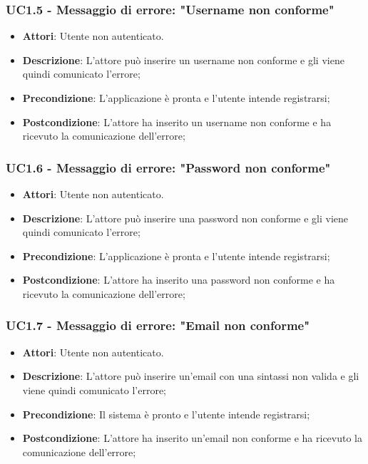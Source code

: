 \subsubsection{UC1.5 - Messaggio di errore: "Username non conforme"} 
\label{sssec:UC1.5} 
\begin{itemize} 
\item \textbf{Attori}: Utente non autenticato.
\item \textbf{Descrizione}: L'attore può inserire un username non conforme e gli viene quindi comunicato l'errore;
\item \textbf{Precondizione}: L'applicazione è pronta e l'utente intende registrarsi;
\item \textbf{Postcondizione}: L'attore ha inserito un username non conforme e ha ricevuto la comunicazione dell'errore;
\end{itemize} 
\subsubsection{UC1.6 - Messaggio di errore: "Password non conforme"} 
\label{sssec:UC1.6} 
\begin{itemize} 
\item \textbf{Attori}: Utente non autenticato.
\item \textbf{Descrizione}: L'attore può inserire una password non conforme e gli viene quindi comunicato l'errore;
\item \textbf{Precondizione}: L'applicazione è pronta e l'utente intende registrarsi;
\item \textbf{Postcondizione}: L'attore ha inserito una password non conforme e ha ricevuto la comunicazione dell'errore;
\end{itemize} 
\subsubsection{UC1.7 - Messaggio di errore: "Email non conforme"} 
\label{sssec:UC1.7} 
\begin{itemize} 
\item \textbf{Attori}: Utente non autenticato.
\item \textbf{Descrizione}: L'attore può inserire un'email con una sintassi non valida e gli viene quindi comunicato l'errore;
\item \textbf{Precondizione}: Il sistema è pronto e l'utente intende registrarsi;
\item \textbf{Postcondizione}: L'attore ha inserito un'email non conforme e ha ricevuto la comunicazione dell'errore;
\end{itemize} 
